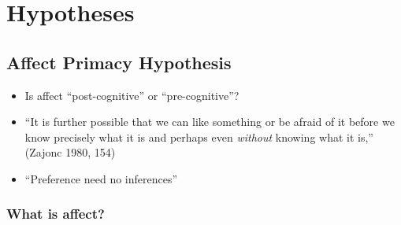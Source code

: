 \documentclass[12pt,letterpaper,table,svgnames,dvipsnames]{article}
\begin{document}
\section{Hypotheses}

\subsection{Affect Primacy Hypothesis}

\begin{itemize}
    \item Is affect ``post-cognitive'' or ``pre-cognitive''?

    \item ``It is further possible that we can like something or be afraid of it before we know precisely what it is and perhaps even \emph{without} knowing what it is,'' (Zajonc 1980, 154)


    \item ``Preference need no inferences''


\end{itemize}

\subsubsection{What is affect?}
\end{document}
